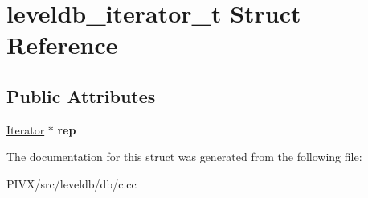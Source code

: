 \hypertarget{structleveldb__iterator__t}{}\section{leveldb\+\_\+iterator\+\_\+t Struct Reference}
\label{structleveldb__iterator__t}
\subsection*{Public Attributes}
\begin{DoxyCompactItemize}
\item 
\mbox{\label{structleveldb__iterator__t_a051a1df01c49d34f34628ae1467f9377}} 
\mbox{\hyperlink{classleveldb_1_1_iterator}{Iterator}} $\ast$ {\bfseries rep}
\end{DoxyCompactItemize}


The documentation for this struct was generated from the following file\+:\begin{DoxyCompactItemize}
\item 
P\+I\+V\+X/src/leveldb/db/c.\+cc\end{DoxyCompactItemize}
